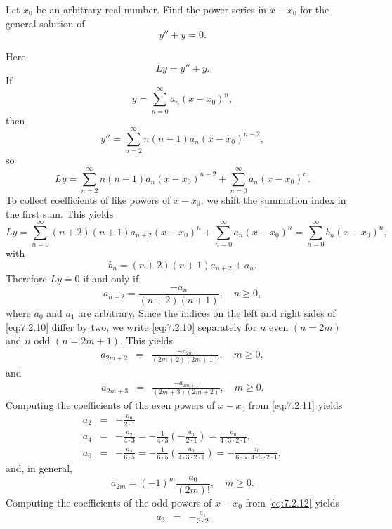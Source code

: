 \documentclass{ximera}
\begin{document}
\begin{example}\label{example:7.2.1}
Let $x_0$ be an arbitrary real number. Find the power series in
$x-x_0$ for the general solution of
\begin{equation}\label{eq:7.2.9}
 y''+ y=0.
\end{equation}
\begin{explanation}
Here
$$
Ly=y''+y.
$$
If
$$
y=\sum_{n=0}^\infty a_n(x-x_0)^n,
$$
then
$$
y''=\sum_{n=2}^\infty n(n-1)a_n(x-x_0)^{n-2},
$$
so
$$
Ly=\sum_{n=2}^\infty n(n-1)a_n(x-x_0)^{n-2}+\sum_{n=0}^\infty a_n(x-x_0)^n.
$$
To collect coefficients of like powers of $x-x_0$, we shift the summation
index in the first sum. This yields
$$
Ly=\sum^\infty_{n=0}(n+2)(n+1)a_{n+2}(x-x_0)^n +
 \sum^\infty_{n=0}a_n(x-x_0)^n
=\sum^\infty_{n=0}b_n(x-x_0)^n,
$$
with
$$
b_n=(n+2)(n+1)a_{n+2}+a_n.
$$
Therefore $Ly=0$ if and only if
\begin{equation}\label{eq:7.2.10}
a_{n+2}=\frac{-a_n}{(n+2)(n+1)},\quad n\geq0,
\end{equation}
where $a_0$ and $a_1$ are arbitrary. Since the indices on the left and
right sides of \eqref{eq:7.2.10} differ by two, we write \eqref{eq:7.2.10}
separately for $n$ even $(n=2m)$ and $n$ odd $(n=2m+1)$. This yields
\begin{eqnarray}
a_{2m+2}&=&\frac{-a_{2m}}{(2m+2)(2m+1)},\quad m\geq0,
\label{eq:7.2.11} 
\end{eqnarray}
and
\begin{eqnarray}
a_{2m+3}&=&\frac{-a_{2m+1}}{(2m+3)(2m+2)},\quad  m\geq0.
\label{eq:7.2.12}
\end{eqnarray}
Computing the coefficients of the even powers of $x-x_0$ from
\eqref{eq:7.2.11} yields
\begin{eqnarray*}
a_2&=&-\frac{a_0}{2\cdot1}\\
a_4&=&-\frac{a_2}{4\cdot3}=-\frac{1}{4\cdot3}
 \left(-\frac{a_0}{2\cdot1}\right)=
 \frac{a_0}{4\cdot3\cdot2\cdot1}, \\
a_6&=&-\frac{a_4}{6\cdot5}=-\frac{1}{6\cdot5}
 \left(\frac{a_0}{4\cdot3\cdot2\cdot1}\right)
=-\frac{a_0}{6\cdot5\cdot4\cdot3\cdot
 2\cdot1},
\end{eqnarray*}
and, in general,
\begin{equation}\label{eq:7.2.13}
a_{2m}=(-1)^m \frac{a_0}{(2m)!}   ,\quad  m\geq0.
\end{equation}
Computing the coefficients of the odd powers of $x-x_0$ from \eqref{eq:7.2.12}
yields
\begin{eqnarray*}
a_3&=&-\frac{a_1}{3\cdot2}\\

\end{eqnarray*}
\end{explanation}
\end{example}
\end{document}
